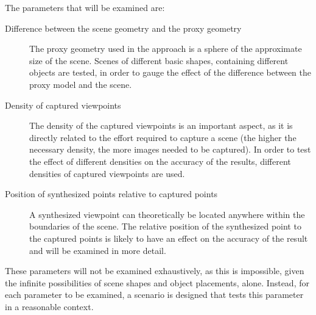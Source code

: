 The parameters that will be examined are:
\begin{description}
  \item[Difference between the scene geometry and the proxy geometry] The proxy geometry used in the approach is a sphere of the approximate size of the scene. Scenes of different basic shapes, containing different objects are tested, in order to gauge the effect of the difference between the proxy model and the scene.
  \item[Density of captured viewpoints] The density of the captured viewpoints is an important aspect, as it is directly related to the effort required to capture a scene (the higher the necessary density, the more images needed to be captured). In order to test the effect of different densities on the accuracy of the results, different densities of captured viewpoints are used.
  \item[Position of synthesized points relative to captured points] A synthesized viewpoint can theoretically be located anywhere within the boundaries of the scene. The relative position of the synthesized point to the captured points is likely to have an effect on the accuracy of the result and will be examined in more detail.
\end{description}

These parameters will not be examined exhaustively, as this is impossible, given the infinite possibilities of scene shapes and object placements, alone. Instead, for each parameter to be examined, a scenario is designed that tests this parameter in a reasonable context.


